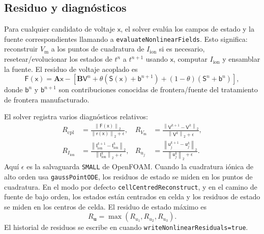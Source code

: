\documentclass[11pt,a4paper]{article}
\newcommand{\code}[1]{\texttt{\small #1}}
\newcommand{\Vm}{V_{\text{m}}}
\newcommand{\Iion}{I_{\mathrm{ion}}}
\newcommand{\Aimp}{\mathbf{A}}
\newcommand{\Bimp}{\mathbf{B}}
\newcommand{\Fres}{\mathsf{F}}
\newcommand{\norm}[1]{\left\lVert #1 \right\rVert}
\begin{document}
\subsection{Residuo y diagnósticos}

Para cualquier candidato de voltaje $\mathsf{x}$, el solver evalúa los campos de estado y la
fuente correspondientes llamando a \code{evaluateNonlinearFields}. Esto significa:
reconstruir $\Vm$ a los puntos de cuadratura de $\Iion$ si es necesario, resetear/evolucionar
los estados de $t^n$ a $t^{n+1}$ usando $\mathsf{x}$, computar $\Iion$ y ensamblar la fuente.
El residuo de voltaje acoplado es
\begin{equation}
  \Fres(\mathsf{x})
  =
  \Aimp\mathsf{x}
  -
  \left[
    \Bimp\mathsf{V}^{n}
    +\theta\left(\mathsf{S}(\mathsf{x})+\mathsf{b}^{n+1}\right)
    +(1-\theta)\left(\mathsf{S}^{n}+\mathsf{b}^{n}\right)
  \right],
  \label{eq:nonlinear-residual}
\end{equation}
donde $\mathsf{b}^{n}$ y $\mathsf{b}^{n+1}$ son contribuciones conocidas de
frontera/fuente del tratamiento de frontera manufacturado.

El solver registra varios diagnósticos relativos:
\begin{align}
  R_{\mathrm{cpl}} &=
  \frac{\norm{\Fres(\mathsf{x})}_2}
       {\norm{\mathsf{r}(\mathsf{x})}_2+\epsilon},
  &
  R_{\Vm} &=
  \frac{\norm{\mathsf{V}^{k+1}-\mathsf{V}^{k}}_2}
       {\norm{\mathsf{V}^{k}}_2+\epsilon},\\
  R_{\Iion} &=
  \frac{\norm{\mathsf{I}^{k+1}_{\mathrm{ion}}-\mathsf{I}^{k}_{\mathrm{ion}}}_2}
       {\norm{\mathsf{I}^{k}_{\mathrm{ion}}}_2+\epsilon},
  &
  R_{u_j} &=
  \frac{\norm{\mathsf{u}^{k+1}_{j}-\mathsf{u}^{k}_{j}}_2}
       {\norm{\mathsf{u}^{k}_{j}}_2+\epsilon}.
\end{align}
Aquí $\epsilon$ es la salvaguarda \code{SMALL} de OpenFOAM. Cuando la cuadratura iónica de
alto orden usa \code{gaussPointODE}, los residuos de estado se miden en los puntos de
cuadratura. En el modo por defecto \code{cellCentredReconstruct}, y en el camino de fuente de
bajo orden, los estados están centrados en celda y los residuos de estado se
miden en los centros de celda. El residuo de estado máximo es
\begin{equation}
  R_{\mathbf{u}}=\max(R_{u_1},R_{u_2},R_{u_3}).
\end{equation}
El historial de residuos se escribe en
 cuando
\code{writeNonlinearResiduals=true}.
\end{document}
